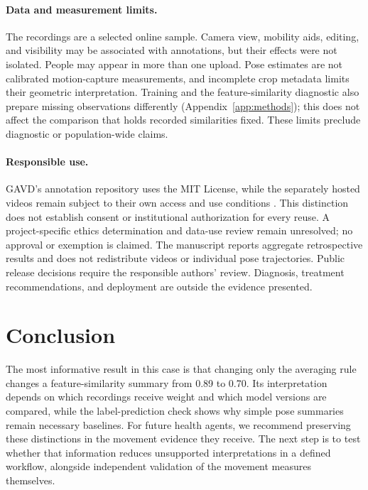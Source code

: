 \documentclass{article}
\begin{document}
\paragraph{Data and measurement limits.}
The recordings are a selected online sample. Camera view, mobility aids, editing, and visibility may be associated with annotations, but their effects were not isolated. People may appear in more than one upload. Pose estimates are not calibrated motion-capture measurements, and incomplete crop metadata limits their geometric interpretation. Training and the feature-similarity diagnostic also prepare missing observations differently (Appendix~\ref{app:methods}); this does not affect the comparison that holds recorded similarities fixed. These limits preclude diagnostic or population-wide claims.

\paragraph{Responsible use.}
GAVD's annotation repository uses the MIT License, while the separately hosted videos remain subject to their own access and use conditions \citep{gavdRepo2026,gavdLicense}. This distinction does not establish consent or institutional authorization for every reuse. A project-specific ethics determination and data-use review remain unresolved; no approval or exemption is claimed. The manuscript reports aggregate retrospective results and does not redistribute videos or individual pose trajectories. Public release decisions require the responsible authors' review. Diagnosis, treatment recommendations, and deployment are outside the evidence presented.

\section{Conclusion}

The most informative result in this case is that changing only the averaging rule changes a feature-similarity summary from 0.89 to 0.70. Its interpretation depends on which recordings receive weight and which model versions are compared, while the label-prediction check shows why simple pose summaries remain necessary baselines. For future health agents, we recommend preserving these distinctions in the movement evidence they receive. The next step is to test whether that information reduces unsupported interpretations in a defined workflow, alongside independent validation of the movement measures themselves.
\end{document}
